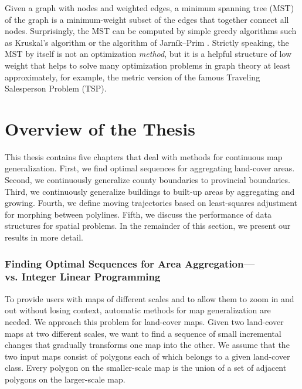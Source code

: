 Given a graph with nodes and weighted edges, 
a minimum spanning tree (MST) of the graph 
is a minimum-weight subset
of the edges that together connect all nodes.
Surprisingly, the MST can be computed 
by simple greedy algorithms
such as Kruskal's algorithm \parencite{Kruskal1956}
or the algorithm of Jarn\'ik--Prim 
\parencite{Jarnik1930,Prim1957}.
Strictly speaking, the MST by itself is not 
an optimization \emph{method}, 
but it is a helpful structure of low weight 
that helps to solve many optimization problems 
in graph theory at least approximately, 
for example, the metric version of the famous Traveling
Salesperson Problem (TSP).


\section{Overview of the Thesis}
\label{sec:Intro_Overview}

This thesis contains five chapters 
that deal with methods for continuous map generalization. 
First, we find optimal sequences 
for aggregating land-cover areas.
%
Second, we continuously generalize county boundaries to
provincial boundaries.
%
Third, we continuously generalize buildings to built-up areas 
by aggregating and growing.
%
Fourth, we define moving trajectories
based on least-squares adjustment
for morphing between polylines.
%
Fifth, we discuss the performance 
of data structures for spatial problems.
%
In the remainder of this section, 
we present our results in more detail.


\subsubsection{%
Finding Optimal Sequences for Area Aggregation---\\
\Astar vs. Integer Linear Programming}

To provide users with maps of different scales and 
to allow them to zoom in and out without losing context,
automatic methods for map generalization are needed.
We approach this problem for land-cover maps.
Given two land-cover maps at two different scales, 
we want to find a sequence of small incremental
changes that gradually transforms one map into the other.
We assume that the two input maps consist of polygons 
each of which belongs to a given land-cover class. 
Every polygon on the smaller-scale map
is the union of a set of adjacent polygons 
on the larger-scale map. 

